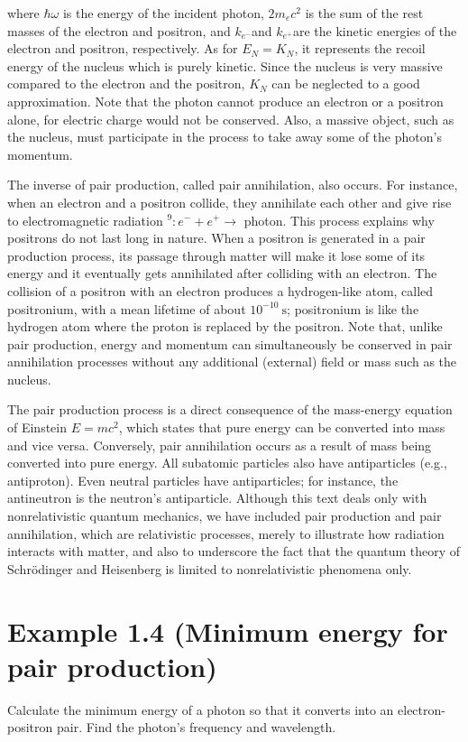 \documentclass[10pt]{article}
\begin{document}
where $\hbar \omega$ is the energy of the incident photon, $2 m_{e} c^{2}$ is the sum of the rest masses of the electron and positron, and $k_{e^{-}}$and $k_{e^{+}}$are the kinetic energies of the electron and positron, respectively. As for $E_{N}=K_{N}$, it represents the recoil energy of the nucleus which is purely kinetic. Since the nucleus is very massive compared to the electron and the positron, $K_{N}$ can be neglected to a good approximation. Note that the photon cannot produce an electron or a positron alone, for electric charge would not be conserved. Also, a massive object, such as the nucleus, must participate in the process to take away some of the photon's momentum.

The inverse of pair production, called pair annihilation, also occurs. For instance, when an electron and a positron collide, they annihilate each other and give rise to electromagnetic radiation ${ }^{9}: e^{-}+e^{+} \rightarrow$ photon. This process explains why positrons do not last long in nature. When a positron is generated in a pair production process, its passage through matter will make it lose some of its energy and it eventually gets annihilated after colliding with an electron. The collision of a positron with an electron produces a hydrogen-like atom, called positronium, with a mean lifetime of about $10^{-10} \mathrm{~s}$; positronium is like the hydrogen atom where the proton is replaced by the positron. Note that, unlike pair production, energy and momentum can simultaneously be conserved in pair annihilation processes without any additional (external) field or mass such as the nucleus.

The pair production process is a direct consequence of the mass-energy equation of Einstein $E=m c^{2}$, which states that pure energy can be converted into mass and vice versa. Conversely, pair annihilation occurs as a result of mass being converted into pure energy. All subatomic particles also have antiparticles (e.g., antiproton). Even neutral particles have antiparticles; for instance, the antineutron is the neutron's antiparticle. Although this text deals only with nonrelativistic quantum mechanics, we have included pair production and pair annihilation, which are relativistic processes, merely to illustrate how radiation interacts with matter, and also to underscore the fact that the quantum theory of Schrödinger and Heisenberg is limited to nonrelativistic phenomena only.

\section*{Example 1.4 (Minimum energy for pair production)}
Calculate the minimum energy of a photon so that it converts into an electron-positron pair. Find the photon's frequency and wavelength.
\end{document}
